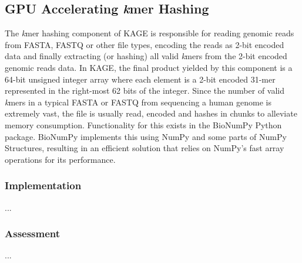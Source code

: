 \subsection{GPU Accelerating \textit{k}mer Hashing} \label{methods:gpu_accelerating_kmer_hashing}
The \textit{k}mer hashing component of KAGE is responsible for reading genomic reads from FASTA, FASTQ or other file types, encoding the reads as 2-bit encoded data and finally extracting (or hashing) all valid \textit{k}mers from the 2-bit encoded genomic reads data.
In KAGE, the final product yielded by this component is a 64-bit unsigned integer array where each element is a 2-bit encoded 31-mer represented in the right-most 62 bits of the integer.
Since the number of valid \textit{k}mers in a typical FASTA or FASTQ from sequencing a human genome is extremely vast, the file is usually read, encoded and hashes in chunks to alleviate memory consumption.
Functionality for this exists in the BioNumPy Python package.
BioNumPy implements this using NumPy and some parts of NumPy Structures, resulting in an efficient solution that relies on NumPy's fast array operations for its performance.

\subsubsection{Implementation}
...

\subsubsection{Assessment}
...
